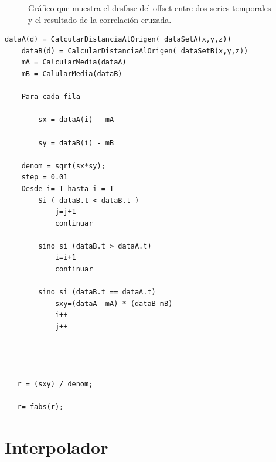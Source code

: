 \begin{figure}[H]
\begin{center}
\hspace{0.5cm}

\end{center}

\caption{Gráfico que muestra el desfase del offset entre dos series temporales y el resultado de la correlación cruzada.}
\end{figure}
	                                
	\begin{lstlisting}[frame=single]
	dataA(d) = CalcularDistanciaAlOrigen( dataSetA(x,y,z))
	dataB(d) = CalcularDistanciaAlOrigen( dataSetB(x,y,z))
	mA = CalcularMedia(dataA)
	mB = CalularMedia(dataB)

	Para cada fila

   		sx = dataA(i) - mA

   		sy = dataB(i) - mB

   	denom = sqrt(sx*sy);
   	step = 0.01
   	Desde i=-T hasta i = T
   		Si ( dataB.t < dataB.t )
			j=j+1
    		continuar

    	sino si (dataB.t > dataA.t)
    		i=i+1
    		continuar

    	sino si (dataB.t == dataA.t)
    		sxy=(dataA -mA) * (dataB-mB)
        	i++
        	j++


   

   r = (sxy) / denom;

   r= fabs(r);
    \end{lstlisting}



\section{Interpolador}

